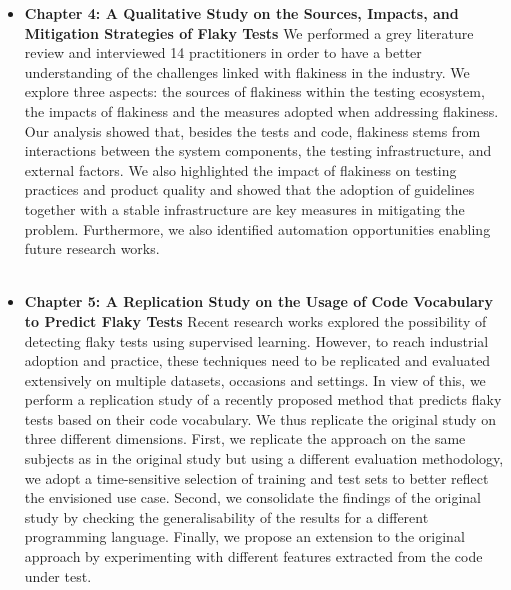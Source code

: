 \begin{itemize}
    \item \textbf{Chapter 4: A Qualitative Study on the Sources, Impacts, and Mitigation Strategies of Flaky Tests} We performed a grey literature review and interviewed 14 practitioners in order to have a better understanding of the challenges linked with flakiness in the industry. We explore three aspects: the sources of flakiness within the testing ecosystem, the impacts of flakiness and the measures adopted when addressing flakiness. Our analysis showed that, besides the tests and code, flakiness stems from interactions between the system components, the testing infrastructure, and external factors. We also highlighted the impact of flakiness on testing practices and product quality and showed that the adoption of guidelines together with a stable infrastructure are key measures in mitigating the problem. Furthermore, we also identified automation opportunities enabling future research works.\\ \\
    
    
    \item \textbf{Chapter 5: A Replication Study on the Usage of Code Vocabulary to Predict Flaky Tests} Recent research works explored the possibility of detecting flaky tests using supervised learning. However, to reach industrial adoption and practice, these techniques need to be replicated and evaluated extensively on multiple datasets, occasions and settings. In view of this, we perform a replication study of a recently proposed method that predicts flaky tests based on their code vocabulary. We thus replicate the original study on three different dimensions. First, we replicate the approach on the same subjects as in the original study but using a different evaluation methodology, \ie we adopt a time-sensitive selection of training and test sets to better reflect the envisioned use case. Second, we consolidate the findings of the original study by checking the generalisability of the results for a different programming language. Finally, we propose an extension to the original approach by experimenting with different features extracted from the code under test.\\
    

\end{itemize}
